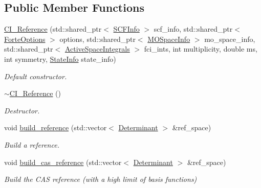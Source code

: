 \subsection*{Public Member Functions}
\begin{DoxyCompactItemize}
\item 
\mbox{\hyperlink{classforte_1_1_c_i___reference_ace7be9be58a678458e45ef781140c8ae}{C\+I\+\_\+\+Reference}} (std\+::shared\+\_\+ptr$<$ \mbox{\hyperlink{classforte_1_1_s_c_f_info}{S\+C\+F\+Info}} $>$ scf\+\_\+info, std\+::shared\+\_\+ptr$<$ \mbox{\hyperlink{classforte_1_1_forte_options}{Forte\+Options}} $>$ options, std\+::shared\+\_\+ptr$<$ \mbox{\hyperlink{classforte_1_1_m_o_space_info}{M\+O\+Space\+Info}} $>$ mo\+\_\+space\+\_\+info, std\+::shared\+\_\+ptr$<$ \mbox{\hyperlink{classforte_1_1_active_space_integrals}{Active\+Space\+Integrals}} $>$ fci\+\_\+ints, int multiplicity, double ms, int symmetry, \mbox{\hyperlink{classforte_1_1_state_info}{State\+Info}} state\+\_\+info)
\begin{DoxyCompactList}\small\item\em Default constructor. \end{DoxyCompactList}\item 
\mbox{\hyperlink{classforte_1_1_c_i___reference_a35b5f56e2dc8ad209ae7afbcb7ef3e69}{$\sim$\+C\+I\+\_\+\+Reference}} ()
\begin{DoxyCompactList}\small\item\em Destructor. \end{DoxyCompactList}\item 
void \mbox{\hyperlink{classforte_1_1_c_i___reference_a8a3e9764cde3969abcf88b688f5440d2}{build\+\_\+reference}} (std\+::vector$<$ \mbox{\hyperlink{namespaceforte_a2076c63fd7b8732004d9e1442ce527c1}{Determinant}} $>$ \&ref\+\_\+space)
\begin{DoxyCompactList}\small\item\em Build a reference. \end{DoxyCompactList}\item 
void \mbox{\hyperlink{classforte_1_1_c_i___reference_a9f2dad6f5ae3ece6d385a519b2a98d12}{build\+\_\+cas\+\_\+reference}} (std\+::vector$<$ \mbox{\hyperlink{namespaceforte_a2076c63fd7b8732004d9e1442ce527c1}{Determinant}} $>$ \&ref\+\_\+space)
\begin{DoxyCompactList}\small\item\em Build the C\+AS reference (with a high limit of basis functions) \end{DoxyCompactList}\item 

\end{DoxyCompactItemize}
